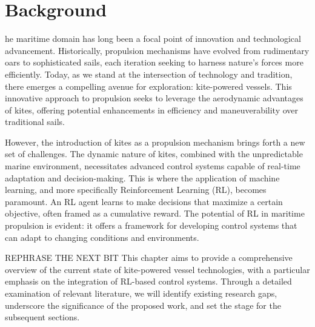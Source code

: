 %

%
\let\textcircled=\pgftextcircled
\chapter{Background}\label{chap:background}





he maritime domain has long been a focal point of innovation and technological advancement. Historically, propulsion mechanisms have evolved from rudimentary oars to sophisticated sails, each iteration seeking to harness nature's forces more efficiently. Today, as we stand at the intersection of technology and tradition, there emerges a compelling avenue for exploration: kite-powered vessels. This innovative approach to propulsion seeks to leverage the aerodynamic advantages of kites, offering potential enhancements in efficiency and maneuverability over traditional sails.

However, the introduction of kites as a propulsion mechanism brings forth a new set of challenges. The dynamic nature of kites, combined with the unpredictable marine environment, necessitates advanced control systems capable of real-time adaptation and decision-making. This is where the application of machine learning, and more specifically Reinforcement Learning (RL), becomes paramount. An RL agent learns to make decisions that maximize a certain objective, often framed as a cumulative reward. The potential of RL in maritime propulsion is evident: it offers a framework for developing control systems that can adapt to changing conditions and environments.

REPHRASE THE NEXT BIT
\newline
This chapter aims to provide a comprehensive overview of the current state of kite-powered vessel technologies, with a particular emphasis on the integration of RL-based control systems. Through a detailed examination of relevant literature, we will identify existing research gaps, underscore the significance of the proposed work, and set the stage for the subsequent sections.

